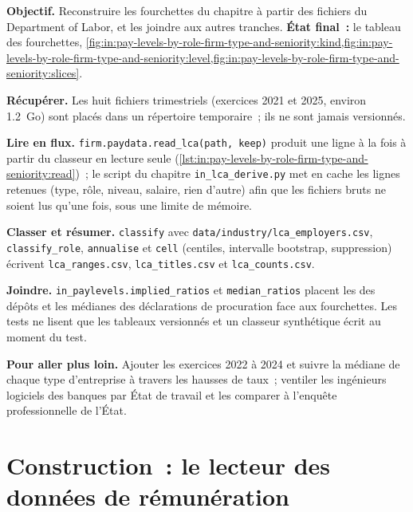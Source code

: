 \begin{tutorial}
\textbf{Objectif.} Reconstruire les fourchettes du chapitre à partir des fichiers du Department of Labor, et les joindre aux autres tranches.
\textbf{État final~:} le tableau des fourchettes,
\cref{fig:in:pay-levels-by-role-firm-type-and-seniority:kind,fig:in:pay-levels-by-role-firm-type-and-seniority:level,fig:in:pay-levels-by-role-firm-type-and-seniority:slices}.
\begin{tutsteps}
\item \textbf{Récupérer.} Les huit fichiers trimestriels (exercices 2021 et 2025, environ 1.2~Go) sont placés dans un répertoire temporaire~; ils ne sont
jamais versionnés.
\item \textbf{Lire en flux.} \texttt{firm.paydata.read\_lca(path, keep)} produit une ligne à la fois à partir du classeur en lecture seule
(\cref{lst:in:pay-levels-by-role-firm-type-and-seniority:read})~; le script du chapitre
\texttt{in\_lca\_derive.py} met en cache les lignes retenues (type, rôle, niveau, salaire, rien d'autre) afin que les fichiers bruts ne soient lus qu'une fois,
sous une limite de mémoire.
\label{lst:in:pay-levels-by-role-firm-type-and-seniority:read}
\item \textbf{Classer et résumer.} \texttt{classify} avec \texttt{data/industry/lca\_employers.csv},
\texttt{classify\_role}, \texttt{annualise} et \texttt{cell} (centiles, intervalle bootstrap, suppression) écrivent
\texttt{lca\_ranges.csv}, \texttt{lca\_titles.csv} et \texttt{lca\_counts.csv}.
\item \textbf{Joindre.} \texttt{in\_paylevels.implied\_ratios} et \texttt{median\_ratios} placent les  des dépôts et
les médianes des déclarations de procuration face aux fourchettes. Les tests ne lisent que les tableaux versionnés et un classeur synthétique écrit
au moment du test.
\end{tutsteps}
\end{tutorial}

\textbf{Pour aller plus loin.} Ajouter les exercices 2022 à 2024 et suivre la médiane de chaque type d'entreprise à travers les hausses de taux~; ventiler les
ingénieurs logiciels des banques par État de travail et les comparer à l'enquête professionnelle de l'État.

\section{Construction~: le lecteur des données de rémunération}\label{bld:in:pay-levels-by-role-firm-type-and-seniority:paydata}


